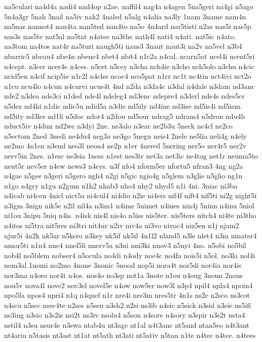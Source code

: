{na5culari
na4d4a
nadi4
nad4op
n2ae.
naffil4
nag4a
n4agen
5na5geri
na4gi
n5ago
5n4a3gr
5nah
5nail
na5iv
nak2
4naled
n5alg
n4alia
na3ly
1nam
3name
nam4n
na5nas
nannot4
nan4ta
nan5ted
nan4to
na5o
4n4ard
nar5tisti
n2as
nas5i
nas5p
nas3s
nas5te
nat5al
na5tat
n4atee
na3the
nath4l
nati4
n4ati.
nat5ic
n4ato.
na3tom
na4tos
nat4r
na5turi
naugh5ti
naus3
3naut
naut3i
na2v
na5vel
n3b4
nbarric5
nbeau4
nbe4n
nbene4
nbet4
nbit4
n1c2a
n4cal.
ncarn5at
ncel4i
ncent5ri
n4cept.
n3cer
ncer4e
n4ces.
n5cet
n5cey
n3cha
nch4ie
n3cho
nch5olo
n3chu
n4cic
ncid5en
n4cif
ncip5ie
n1c2l
n4cles
ncoc4
nco5pat
n1cr
nc1t
nc4tin
nct4ivi
nct2o
n1cu
ncu4lo
n4cun
n4curvi
ncus4t
4nd
n2da
n3da4c
n3dal
n4dale
n3dam
nd3anc
nde2
n3dea
nde3ci
n1ded
nde4l
ndeleg4
nd3enc
ndepre4
n3derl
nde4s
ndes5cr
n5dez
nd4hi
n1dic
ndic5u
ndid5a
n3die
nd5ily
nd4ine
nd3ise
nd5is4i
nd5ism.
nd5ity
nd3ler
nd1li
n5doc
ndor4
n2dou
nd5our
ndrag5
ndram4
n5dron
ndu4b
nduct5iv
n4dun
nd2we
n3dyi
2ne.
ne3alo
n3ear
ne2b3u
5neck
ne4cl
ne2co
n5ectom
2ned
3nedi
ne4du4
neg3a
ne3go
5negu
neis4
2nele
ne5lia
neli4g
n4ely
ne2mo
4n1en
n3end
neo3l
neon4
ne2p
n1er
4nered
5nering
ner5o
ner4r5
ner2v
nerv5in
2nes.
n1esc
ne3sia
1ness
n1est
nes3tr
net3a
net3ic
ne4tog
net1r
neuma5to
neut5r
nev5er
n4ew
news3
n4eys.
n3f
nfo4
nform5er
nfortu5
nfran3
4ng
ng2a
n4gae
n5gee
n3geri
n5gero
ngh4
n2gi
n5gic
ngio4g
n5glem
n3glie
n5glio
ng1n
n1go
n4gry
n1gu
n2gum
n1h2
nhab3
nho4
nhy2
nhyd5
n1i
4ni.
3niac
ni3ba
n4icab
ni4cen
4nicl
nict5a
ni4cul4
ni4dio
n2ie
ni4ers
nif4f
nift4
nif5ti
ni2g
night5i
n3igm
3nign
nik5e
n2il
nil4a
n3im1
n4ime
5nimet
n4ines
nin4j
5ninn
n4inu
5niol
ni1ou
3nipu
5niq
n4is.
n4isk
nis4l
nis4o
n5iss
nis5ter.
nis5ters
nitch4
ni4te
ni3tho
n4itos
ni5tra
nit5res
ni3tri
nit4ur
n2iv
niv4a
ni3vo
nivoc4
niz5en
n1j
njam2
njur5i
4n2k
nk5ar
n5kero
n3key
nk5if
nk5il
4n1l2
nland5
n3le
nlet4
n3m
nmater4
nmor5ti
n1n4
nne4
nnel5li
nnerv5a
n3ni
nni3ki
nnov3
n5nyi
4no.
n5obi
no5bil
nob4l
no5blem
nobser4
n5ocula
no4di
n4ody
noe4c
no4fa
nois5i
n5ol.
no3la
nol4i
nom3al
1nomi
no2mo
4none
3nonic
5nood
nop5i
nora4t
nor5di
nor4ia
nor4is
nor3ma
n4oro
nor4t
n4os.
nos4o
no3sp
not1a
3note
n1ou
n4oug
3noun
2nous
nou5v
nova4l
nove2
nov3el
novel5e
n4ow
now5er
now3l
n3p4
npil4
npla4
npoin4
npo5la
npos4
npri4
n1q
n4quef
n1r
nre4i
nre3m
nres5tr
4n1s
ns2c
n2sco
ns3cot
n4scu
n5sec
nsec4te
n2ses
n5seu
n3sh2
n2si
ns3ib
n4sic
n5sick
n3sid
n3sie
ns5ifi
ns3ing
n3sio
n3s2is
nsi2t
ns3iv
nsolu4
n5son
n4sore
n4sory
n3spir
n3s2t
nsta4
nstil4
n3su
nsur4e
n3swa
ntab4u
nt3age
nt1al
n4t3anc
nt5and
ntan5eo
n4t3ant
nt4ariu
n5tasis
nt3ast
nt1at
nt5ath
nt3ati
nt5ativ
n5tau
n1te
n4tec
n4tee.
n4tees
}
